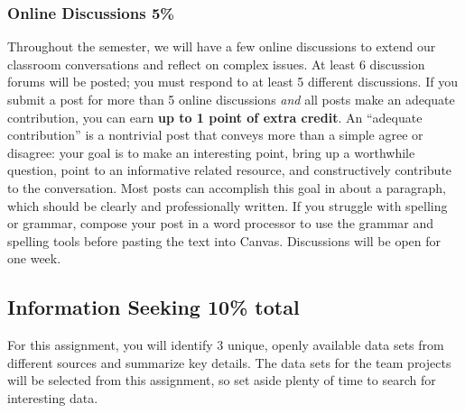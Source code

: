 \documentclass[11pt]{article}
\begin{document}
\subsubsection{Online Discussions  5\%}

Throughout the semester, we will have a few online discussions to extend our classroom conversations and reflect on complex issues.
At least 6 discussion forums will be posted; you must respond to at least 5 different discussions.
If you submit a post for more than 5 online discussions \textit{and} all posts make an adequate contribution, you can earn \textbf{up to 1 point of extra credit}.
An ``adequate contribution'' is a nontrivial post that conveys more than a simple agree or disagree: your goal is to make an interesting point, bring up a worthwhile question, point to an informative related resource, and constructively contribute to the conversation.
Most posts can accomplish this goal in about a paragraph, which should be clearly and professionally written.
If you struggle with spelling or grammar, compose your post in a word processor to use the grammar and spelling tools before pasting the text into Canvas.
Discussions will be open for one week.

\subsection{Information Seeking  10\% total}

For this assignment, you will identify 3 unique, openly available data sets from different sources and summarize key details.
The data sets for the team projects will be selected from this assignment, so set aside plenty of time to search for interesting data.
\end{document}
